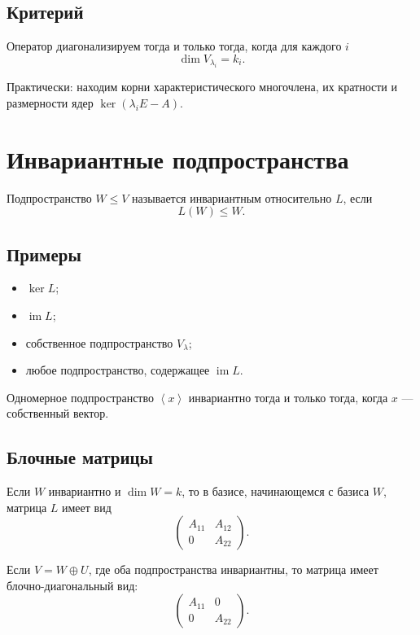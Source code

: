 \documentclass[12pt,a4paper]{article}
\DeclareMathOperator{\Ker}{ker}
\DeclareMathOperator{\Image}{im}
\newcommand{\Lin}[1]{\left\langle #1 \right\rangle}
\begin{document}
\subsection*{Критерий}

Оператор диагонализируем тогда и только тогда, когда для каждого $i$
\[
    \dim V_{\lambda_i}=k_i.
\]

Практически: находим корни характеристического многочлена, их кратности и размерности ядер $\Ker(\lambda_iE-A)$.

\section{Инвариантные подпространства}

Подпространство $W\le V$ называется инвариантным относительно $L$, если
\[
    L(W)\le W.
\]

\subsection*{Примеры}

\begin{itemize}
    \item $\Ker L$;
    \item $\Image L$;
    \item собственное подпространство $V_\lambda$;
    \item любое подпространство, содержащее $\Image L$.
\end{itemize}

Одномерное подпространство $\Lin{x}$ инвариантно тогда и только тогда, когда $x$ --- собственный вектор.

\subsection*{Блочные матрицы}

Если $W$ инвариантно и $\dim W=k$, то в базисе, начинающемся с базиса $W$, матрица $L$ имеет вид
\[
    \begin{pmatrix}
        A_{11} & A_{12}\\
        0 & A_{22}
    \end{pmatrix}.
\]

Если $V=W\oplus U$, где оба подпространства инвариантны, то матрица имеет блочно-диагональный вид:
\[
    \begin{pmatrix}
        A_{11} & 0\\
        0 & A_{22}
    \end{pmatrix}.
\]
\end{document}

